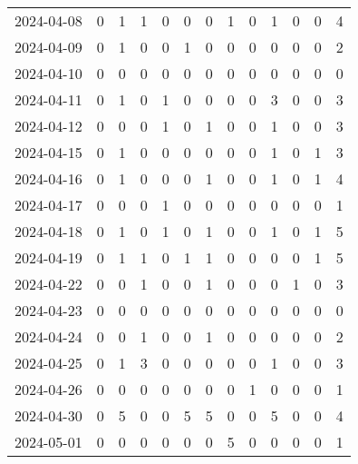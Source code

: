 \documentclass[dvipdfmx,oneside]{article}
\begin{document}
\begin{longtable}{lcccccccccccc}
        2024-04-08 &     0 &     1 &     1 &     0 &     0 &     0 &     1 &     0 &     1 &     0 &     0 &      4 \\
        2024-04-09 &     0 &     1 &     0 &     0 &     1 &     0 &     0 &     0 &     0 &     0 &     0 &      2 \\
        2024-04-10 &     0 &     0 &     0 &     0 &     0 &     0 &     0 &     0 &     0 &     0 &     0 &      0 \\
        2024-04-11 &     0 &     1 &     0 &     1 &     0 &     0 &     0 &     0 &     3 &     0 &     0 &      3 \\
        2024-04-12 &     0 &     0 &     0 &     1 &     0 &     1 &     0 &     0 &     1 &     0 &     0 &      3 \\
        2024-04-15 &     0 &     1 &     0 &     0 &     0 &     0 &     0 &     0 &     1 &     0 &     1 &      3 \\
        2024-04-16 &     0 &     1 &     0 &     0 &     0 &     1 &     0 &     0 &     1 &     0 &     1 &      4 \\
        2024-04-17 &     0 &     0 &     0 &     1 &     0 &     0 &     0 &     0 &     0 &     0 &     0 &      1 \\
        2024-04-18 &     0 &     1 &     0 &     1 &     0 &     1 &     0 &     0 &     1 &     0 &     1 &      5 \\
        2024-04-19 &     0 &     1 &     1 &     0 &     1 &     1 &     0 &     0 &     0 &     0 &     1 &      5 \\
        2024-04-22 &     0 &     0 &     1 &     0 &     0 &     1 &     0 &     0 &     0 &     1 &     0 &      3 \\
        2024-04-23 &     0 &     0 &     0 &     0 &     0 &     0 &     0 &     0 &     0 &     0 &     0 &      0 \\
        2024-04-24 &     0 &     0 &     1 &     0 &     0 &     1 &     0 &     0 &     0 &     0 &     0 &      2 \\
        2024-04-25 &     0 &     1 &     3 &     0 &     0 &     0 &     0 &     0 &     1 &     0 &     0 &      3 \\
        2024-04-26 &     0 &     0 &     0 &     0 &     0 &     0 &     0 &     1 &     0 &     0 &     0 &      1 \\
        2024-04-30 &     0 &     5 &     0 &     0 &     5 &     5 &     0 &     0 &     5 &     0 &     0 &      4 \\
        2024-05-01 &     0 &     0 &     0 &     0 &     0 &     0 &     5 &     0 &     0 &     0 &     0 &      1 \\

\end{longtable}
\end{document}
